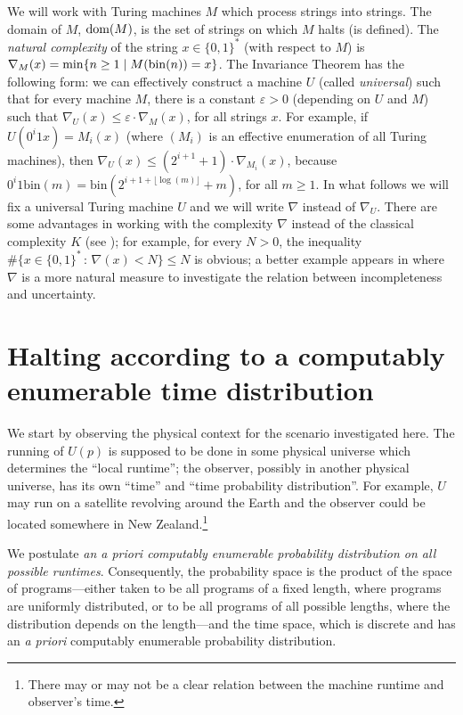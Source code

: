 \documentclass[12pt,twoside,openright]{report}
\newcommand{\dom}{\mbox{\rm dom}}
\newcommand{\bin}{\mbox{bin}}
\begin{document}
We will work with  Turing machines $M$  which process  strings into  strings. The domain of $M$, $\dom (M)$, is the set of strings on which $M$ halts (is defined).  The  {\it natural complexity} \cite{CSNatural2006} of the string $x\in\{0, 1\}^*$ (with respect to $M$) is $\nabla_M(x) = \min\{n\ge 1 \mid M({\rm bin}(n))=x\}$.  The Invariance Theorem \cite{Calude} has the following form: we can effectively construct a machine $U$ (called {\em universal}) such that for every  machine $M$, there is a constant $\varepsilon>0$ (depending on $U$ and $M$) such that $\nabla_U (x) \leq \varepsilon \cdot \nabla_M (x)$, for all strings $x$. For example, if $U(0^{i}1x) = M_{i}(x)$ (where $(M_{i})$ is an effective enumeration of all Turing machines), then $\nabla_{U}(x) \le (2^{i+1}+1)\cdot \nabla_{M_{i}}(x)$, because $0^{i}1\bin(m) = \bin (2^{i+1 +\lfloor \log (m)\rfloor}+m)$, for all $m\ge 1$. In what follows we will fix a universal Turing machine $U$ and we will write $\nabla$ instead of $\nabla_{U}$. There are some advantages in working with the complexity $\nabla$ instead of the classical complexity $K$ (see \cite{Calude});  for example, for every $N>0$, the inequality $\#\{x\in \{0, 1\}^{*}\,:\, \nabla (x) <N\}\le N$ is  obvious; a better example appears in \cite{cs0} where $\nabla$ is a more natural measure to investigate the relation between incompleteness and uncertainty.
 

\section{Halting according to a computably enumerable time distribution}

We start by observing the physical context for the scenario investigated here.  The running of $U(p)$ is supposed to be done in some physical universe which determines the ``local runtime''; the observer, possibly in another physical universe, has its own ``time'' and ``time probability distribution''.  For example, $U$ may run on a satellite revolving around the Earth and the observer could be located somewhere in New Zealand.\footnote{There may or may not be a clear relation between the machine runtime and observer's time. }
\fi

We postulate {\it an a priori computably enumerable probability distribution on all possible runtimes}. Consequently, the probability space is the product of the space of programs---either taken to be all programs of a fixed length, where programs are uniformly distributed, or to be all programs of all possible lengths, where the distribution depends on the length---and the time space, which is discrete and has an {\it a priori} computably enumerable probability distribution. 
\end{document}
